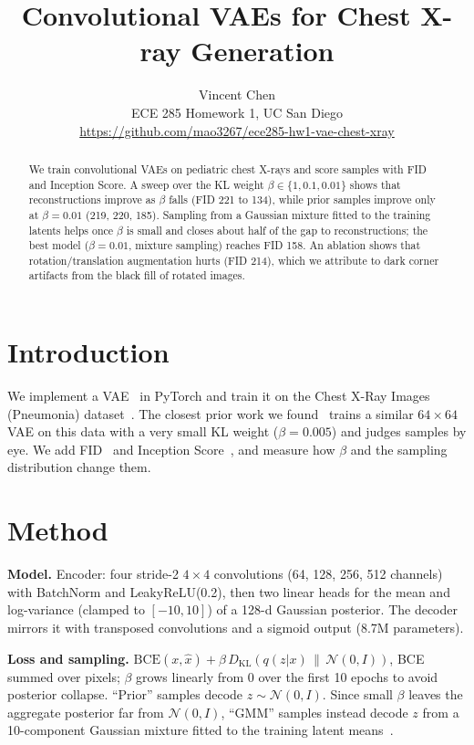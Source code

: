 \documentclass{article}
\title{Convolutional VAEs for Chest X-ray Generation}
\author{%
  Vincent Chen \\
  ECE 285 Homework 1, UC San Diego \\
  \url{https://github.com/mao3267/ece285-hw1-vae-chest-xray}
}
\begin{document}
\maketitle
\vspace{-1.2em}

\begin{abstract}
We train convolutional VAEs on pediatric chest X-rays and score samples with FID and Inception Score. A sweep over the KL weight $\beta\in\{1,0.1,0.01\}$ shows that reconstructions improve as $\beta$ falls (FID 221 to 134), while prior samples improve only at $\beta{=}0.01$ (219, 220, 185). Sampling from a Gaussian mixture fitted to the training latents helps once $\beta$ is small and closes about half of the gap to reconstructions; the best model ($\beta{=}0.01$, mixture sampling) reaches FID 158. An ablation shows that rotation/translation augmentation hurts (FID 214), which we attribute to dark corner artifacts from the black fill of rotated images.
\end{abstract}

\section{Introduction}
We implement a VAE~\cite{kingma2014vae} in PyTorch and train it on the Chest X-Ray Images (Pneumonia) dataset~\cite{kermany2018}. The closest prior work we found~\cite{chandra2025cenim} trains a similar $64{\times}64$ VAE on this data with a very small KL weight ($\beta{=}0.005$) and judges samples by eye. We add FID~\cite{heusel2017fid} and Inception Score~\cite{salimans2016is}, and measure how $\beta$ and the sampling distribution change them.

\section{Method}
\textbf{Model.} Encoder: four stride-2 $4{\times}4$ convolutions (64, 128, 256, 512 channels) with BatchNorm and LeakyReLU(0.2), then two linear heads for the mean and log-variance (clamped to $[-10,10]$) of a 128-d Gaussian posterior. The decoder mirrors it with transposed convolutions and a sigmoid output (8.7M parameters).

\textbf{Loss and sampling.} $\mathrm{BCE}(x,\hat x)+\beta\,D_{\mathrm{KL}}(q(z|x)\,\|\,\mathcal{N}(0,I))$, BCE summed over pixels; $\beta$ grows linearly from 0 over the first 10 epochs to avoid posterior collapse. ``Prior'' samples decode $z\sim\mathcal{N}(0,I)$. Since small $\beta$ leaves the aggregate posterior far from $\mathcal{N}(0,I)$, ``GMM'' samples instead decode $z$ from a 10-component Gaussian mixture fitted to the training latent means~\cite{ghosh2019rae}.
\end{document}
